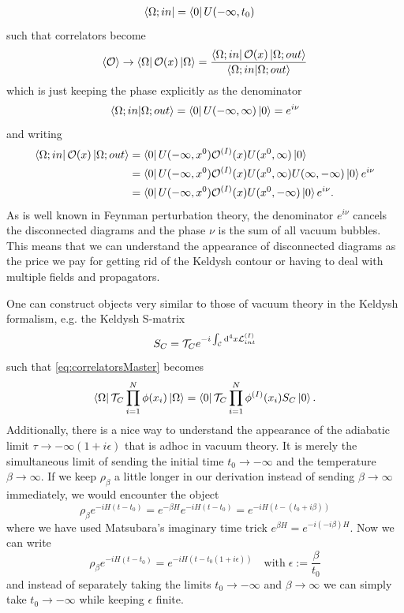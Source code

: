 \begin{enumerate}
\begin{align*}
	\bra{\Omega;in} &= \bra{0}U(-\infty,t_0)
\end{align*}
such that correlators become
\begin{equation*}
	\expval{\mathcal{O}}\rightarrow\bra{\Omega}\mathcal{O}(x) \ket{\Omega}= \frac{\bra{\Omega;in} \mathcal{O}(x) \ket{\Omega;out}}{\braket{\Omega;in}{\Omega;out}}
\end{equation*}
which is just keeping the phase explicitly as the denominator
\begin{equation*}
	\braket{\Omega;in}{\Omega;out} = \bra{0}U(-\infty,\infty) \ket{0}= e^{i\nu} 
\end{equation*}
and writing
\begin{align*}
	\bra{\Omega;in}\mathcal{O}(x) \ket{\Omega;out} &= \bra{0}U(-\infty,x^0) \mathcal{O}^{(I)}(x) U(x^0,\infty) \ket{0}\\
	&= \bra{0}U(-\infty,x^0) \mathcal{O}^{(I)}(x) U(x^0,\infty) U(\infty,-\infty) \ket{0}e^{i\nu}\\
	&= \bra{0}U(-\infty,x^0) \mathcal{O}^{(I)}(x) U(x^0,-\infty) \ket{0}e^{i\nu}.
\end{align*}
As is well known in Feynman perturbation theory, the denominator $e^{i \nu}$ cancels the disconnected diagrams and the phase $\nu$ is the sum of all vacuum bubbles. This means that we can understand the appearance of disconnected diagrams as the price we pay for getting rid of the Keldysh contour or having to deal with multiple fields and propagators.
\end{enumerate} 
One can construct objects very similar to those of vacuum theory in the Keldysh formalism, e.g. the Keldysh S-matrix
\begin{equation*}
	S_C=\mathcal{T}_C e^{-i \int_{\mathcal{C}} \mathrm{d}^4 x \mathcal{L}^{(I)}_{int}}
\end{equation*}
such that \ref{eq:correlatorsMaster} becomes 
\begin{equation*}
	\bra{\Omega}\mathcal{T}_C \prod_{i=1}^{N} \phi(x_i) \ket{\Omega} = \bra{0} \mathcal{T}_C \prod_{i=1}^N \phi^{(I)}(x_i) S_C\ket{0}.
\end{equation*}
Additionally, there is a nice way to understand the appearance of the adiabatic limit $\tau \rightarrow -\infty(1+i\epsilon)$ that is adhoc in vacuum theory. It is merely the simultaneous limit of sending the initial time $t_0\rightarrow -\infty$ and the temperature $\beta \rightarrow\infty$. If we keep $\rho_\beta$ a little longer in our derivation instead of sending $\beta \rightarrow \infty$ immediately, we would encounter the object 
\begin{equation*}
	\rho_\beta e^{-iH(t-t_0)} = e^{-\beta H} e^{-i H(t-t_0)} = e^{-i H(t-(t_0+i\beta))} 
\end{equation*}
where we have used Matsubara's imaginary time trick $e^{\beta H } = e^{-i (-i \beta) H}$. Now we can write 
\begin{equation*}
	\rho_\beta e^{-i H(t-t_0)} = e^{-i H(t-t_0(1+i\epsilon)) } \quad \mathrm{with}\; \epsilon:= \frac{\beta}{t_0}
\end{equation*}
and instead of separately taking the limits $t_0 \rightarrow -\infty$ and $\beta \rightarrow\infty$ we can simply take $t_0 \rightarrow -\infty$ while keeping $\epsilon$ finite.


